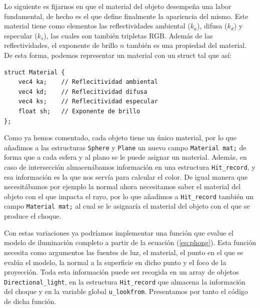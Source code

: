 Lo siguiente es fijarnos en que el material del objeto desempeña una labor fundamental, de hecho es el que define finalmente la apariencia del mismo. Este material tiene como elementos las reflectividades ambiental ($k_a$), difusa ($k_d$) y especular ($k_s$), las cuales son también tripletas RGB. Además de las reflectividades, el exponente de brillo $n$ también es una propiedad del material. De esta forma, podemos representar un material con un struct tal que así:

\begin{lstlisting}
struct Material {
    vec4 ka;    // Reflecitividad ambiental
    vec4 kd;    // Reflecitividad difusa
    vec4 ks;    // Reflecitividad especular
    float sh;   // Exponente de brillo
};
\end{lstlisting}

Como ya hemos comentado, cada objeto tiene un único material, por lo que añadimos a las estructuras \verb|Sphere| y \verb|Plane| un nuevo campo \verb|Material mat;| de forma que a cada esfera y al plano se le puede asignar un material. Además, en caso de intersección almacenábamos información en una estructura \verb|Hit_record|, y esa información es la que nos servía para calcular el color. De igual manera que necesitábamos por ejemplo la normal ahora necesitamos saber el material del objeto con el que impacta el rayo, por lo que añadimos a \verb|Hit_record| también un campo \verb|Material mat;| al cual se le asignaría el material del objeto con el que se produce el choque.

Con estas variaciones ya podríamos implementar una función que evalue el modelo de iluminación completo a partir de la ecuación (\ref{eq:phong}). Esta función necesita como argumentos las fuentes de luz, el material, el punto en el que se evalúa el modelo, la normal a la superficie en dicho punto y el foco de la proyección. Toda esta información puede ser recogida en un array de objetos \verb|Directional_light|, en la estructura \verb|Hit_record| que almacena la información del choque y en la variable global \verb|u_lookfrom|. Presentamos por tanto el código de dicha función.

